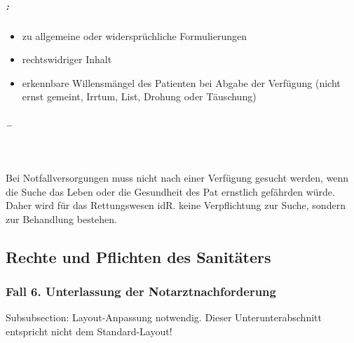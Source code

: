 \subparagraph{:}
    
    
    \begin{itemize}
        \item {\mdseries
        zu allgemeine oder widerspr\"uchliche Formulierungen}
        
        \item {\mdseries
        rechtswidriger Inhalt}
        
        \item {\mdseries
        erkennbare Willensmängel des Patienten bei Abgabe der
        Verf\"ugung (nicht ernst gemeint, Irrtum, List, Drohung oder Täuschung)}
    \end{itemize}


\subparagraph*{ --
}~

Bei Notfallversorgungen muss nicht nach einer Verf\"ugung gesucht
werden, wenn die Suche das Leben oder die Gesundheit des Pat ernstlich
gefährden w\"urde. Daher wird f\"ur das Rettungswesen idR. keine
Verpflichtung zur Suche, sondern zur Behandlung bestehen.




\subsection{Rechte und Pflichten des Sanitäters}

\subsubsection{Fall 6. Unterlassung der Notarztnachforderung}
\begin{anfxwarning}[author=GABS]{Subsubsection: Layout-Anpassung notwendig.}
Dieser Unterunterabschnitt entspricht nicht dem Standard-Layout!
\end{anfxwarning}

